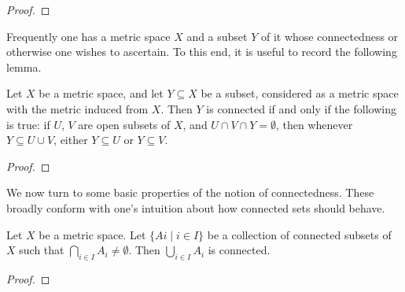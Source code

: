 \begin{proof}

\end{proof}

Frequently one has a metric space $X$ and a subset $Y$ of it whose connectedness or otherwise one wishes to ascertain. To this end, it is useful to record the following lemma.

\begin{lemma}
Let $X$ be a metric space, and let $Y\subseteq X$ be a subset, considered as a metric space with the metric induced from $X$. Then $Y$ is connected if and only if the following is true: if $U$, $V$ are open subsets of $X$, and $U\cap V\cap Y=\emptyset$, then whenever $Y\subseteq U\cup V$, either $Y\subseteq U$ or $Y\subseteq V$.
\end{lemma}

\begin{proof}

\end{proof}

We now turn to some basic properties of the notion of connectedness. These broadly conform with one's intuition about how connected sets should behave.

\begin{lemma}
Let $X$ be a metric space. Let $\{Ai\mid i\in I\}$ be a collection of connected subsets of $X$ such that $\bigcap_{i\in I}A_i\neq\emptyset$. Then $\bigcup_{i\in I}A_i$ is connected.
\end{lemma}

\begin{proof}

\end{proof}

